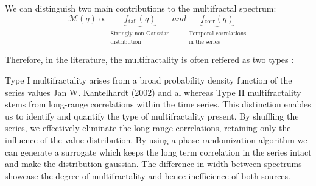 \documentclass[11pt]{extarticle}
\begin{document}
We can distinguish two main contributions to the multifractal spectrum:
\[
\mathcal{M}(q) \propto
\underbrace{f_{\text{tail}}(q)}_{\substack{\text{Strongly non-Gaussian} \\ \text{distribution}}}
and
\underbrace{f_{\text{corr}}(q)}_{\substack{\text{Temporal correlations} \\ \text{in the series}}}
\]

Therefore, in the literature, the multifractality is often reffered as two types :

Type I multifractality arises
from a broad probability density function of the series values Jan W. Kantelhardt (2002) and al whereas Type II
multifractality stems from long-range correlations within the time series. This distinction enables us to identify and quantify
the type of multifractality present. By shuffling the series, we effectively eliminate the long-range correlations,
retaining only the influence of the value distribution. By using a phase randomization algorithm we can generate a surrogate which keeps the long term correlation in the series intact
and make the distribution gaussian.
The difference in width between spectrums showcase the degree of multifractality and hence inefficience of both sources.
\end{document}
